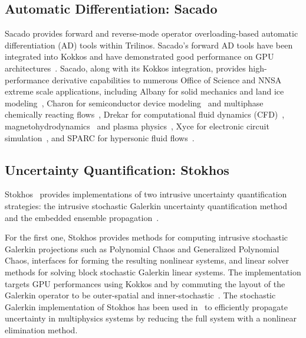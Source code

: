 \subsection{Automatic Differentiation: Sacado} \label{sec:sacado}

Sacado \cite{SacadoURL,phipps2012efficient,phipps2008large} provides forward and reverse-mode operator overloading-based automatic differentiation (AD) tools within Trilinos.
Sacado's forward AD tools have been integrated into Kokkos and have demonstrated good performance on GPU architectures~\cite{phipps2022automatic}.
Sacado, along with its Kokkos integration, provides high-performance derivative capabilities to numerous Office of Science and NNSA extreme scale applications, including Albany for solid mechanics and land ice modeling~\cite{Salinger2016,MPASAlbany2018}, 
Charon for semiconductor device modeling~\cite{CharonUsersManual2020} and multiphase chemically reacting flows~\cite{Musson2009}, Drekar for computational fluid dynamics (CFD)~\cite{Sondak2021,Shadid2016}, magnetohydrodynamics~\cite{Shadid2016mhd} and 
plasma physics~\cite{Crockatt2022,Miller2019}, Xyce for electronic circuit simulation~\cite{xyceTrilinos,xycePCE}, and SPARC for hypersonic fluid flows~\cite{SparcValidation}. 

\subsection{Uncertainty Quantification: Stokhos}

Stokhos~\cite{phipps2015stokhos,Phipps2016,phipps2014exploring} provides implementations of two intrusive uncertainty quantification strategies: 
the intrusive stochastic Galerkin uncertainty quantification method~\cite{ghanem1990polynomial,ghanem2003stochastic} and the embedded ensemble propagation~\cite{phipps2017embedded}.

For the first one, Stokhos provides methods for computing intrusive stochastic Galerkin projections such as Polynomial Chaos and Generalized Polynomial Chaos, 
interfaces for forming the resulting nonlinear systems, and linear solver methods for solving block stochastic Galerkin linear systems.
The implementation targets GPU performances using Kokkos and by commuting the layout of the Galerkin operator to be outer-spatial and inner-stochastic~\cite{phipps2014exploring}.
The stochastic Galerkin implementation of Stokhos has been used in~\cite{constantine2014efficient} to efficiently propagate uncertainty in multiphysics systems by reducing the full system with a nonlinear elimination method.

